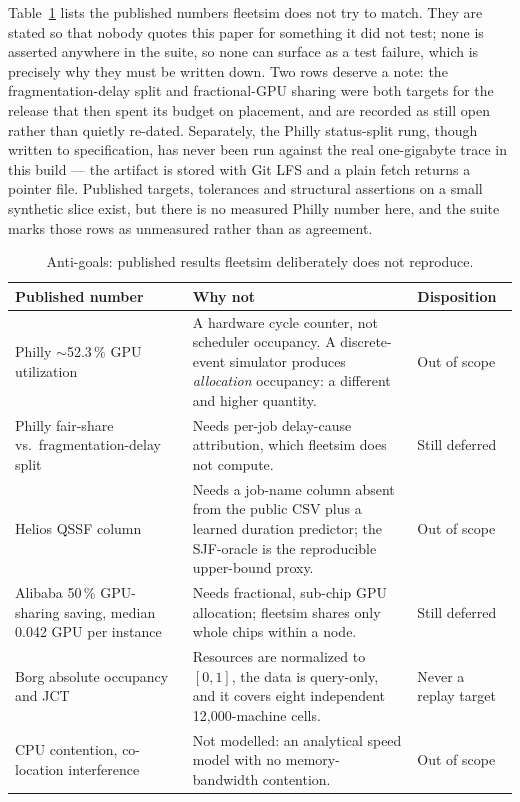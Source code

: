 Table~\ref{tab:antigoals} lists the published numbers fleetsim does not try to
match. They are stated so that nobody quotes this paper for something it did not
test; none is asserted anywhere in the suite, so none can surface as a test
failure, which is precisely why they must be written down. Two rows deserve a
note: the fragmentation-delay split and fractional-GPU sharing were both targets
for the release that then spent its budget on placement, and are recorded as
still open rather than quietly re-dated. Separately, the Philly status-split
rung, though written to specification, has never been run against the real
one-gigabyte trace in this build --- the artifact is stored with Git LFS and a
plain fetch returns a pointer file. Published targets, tolerances and structural
assertions on a small synthetic slice exist, but there is no measured Philly
number here, and the suite marks those rows as unmeasured rather than as
agreement.

\begin{table}[t]
\centering\small
\caption{Anti-goals: published results fleetsim deliberately does not
reproduce.}
\label{tab:antigoals}
\begin{tabular}{p{}p{}l}
\toprule
Published number & Why not & Disposition \\
\midrule
Philly $\sim$52.3\,\% GPU utilization \cite{philly2019} &
A hardware cycle counter, not scheduler occupancy. A discrete-event simulator
produces \emph{allocation} occupancy: a different and higher quantity. &
Out of scope \\
Philly fair-share vs.\ fragmentation-delay split \cite{philly2019} &
Needs per-job delay-cause attribution, which fleetsim does not compute. &
Still deferred \\
Helios QSSF column \cite{helios2021} &
Needs a job-name column absent from the public CSV plus a learned duration
predictor; the SJF-oracle is the reproducible upper-bound proxy. &
Out of scope \\
Alibaba 50\,\% GPU-sharing saving, median 0.042 GPU per instance
\cite{alibabapai2022} &
Needs fractional, sub-chip GPU allocation; fleetsim shares only whole chips
within a node. &
Still deferred \\
Borg absolute occupancy and JCT \cite{borg2015} &
Resources are normalized to $[0,1]$, the data is query-only, and it covers eight
independent 12{,}000-machine cells. &
Never a replay target \\
CPU contention, co-location interference &
Not modelled: an analytical speed model with no memory-bandwidth contention. &
Out of scope \\
\bottomrule
\end{tabular}
\end{table}
